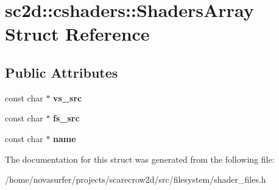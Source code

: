 \hypertarget{structsc2d_1_1cshaders_1_1ShadersArray}{}\section{sc2d\+:\+:cshaders\+:\+:Shaders\+Array Struct Reference}
\label{structsc2d_1_1cshaders_1_1ShadersArray}
\subsection*{Public Attributes}
\begin{DoxyCompactItemize}
\item 
\mbox{\label{structsc2d_1_1cshaders_1_1ShadersArray_a81dff3456b312f137ba8237fdb9662c4}} 
const char $\ast$ {\bfseries vs\+\_\+src}
\item 
\mbox{\label{structsc2d_1_1cshaders_1_1ShadersArray_af9595ccf3a6239f39acc05a7394010de}} 
const char $\ast$ {\bfseries fs\+\_\+src}
\item 
\mbox{\label{structsc2d_1_1cshaders_1_1ShadersArray_aa1e865acb2891ae36d700abc5fd7b23f}} 
const char $\ast$ {\bfseries name}
\end{DoxyCompactItemize}


The documentation for this struct was generated from the following file\+:\begin{DoxyCompactItemize}
\item 
/home/novasurfer/projects/scarecrow2d/src/filesystem/shader\+\_\+files.\+h\end{DoxyCompactItemize}
